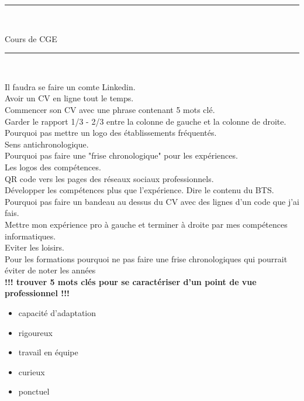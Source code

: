 \documentclass[11pt,a4paper,openany]{book}
\title{}
\author{Serrurot Gabin\\
BTS SNIR}
\date{\today}
\begin{document}
\sloppy

\begin{minipage}{0.9\linewidth}
\rule{\linewidth}{0.5mm}\\[0.2cm]
\huge\bfseries
\begin{center}
Cours de CGE
\end{center}
\rule{\linewidth}{0.5mm}\\[0.2cm]
\maketitle
\end{minipage}

\newpage

\tableofcontents

\newpage

Il faudra se faire un comte Linkedin.\\
Avoir un CV en ligne tout le temps.\\
Commencer son CV avec une phrase contenant 5 mots clé.\\
Garder le rapport 1/3 - 2/3 entre la colonne de gauche et la colonne de droite.\\
Pourquoi pas mettre un logo des établissements fréquentés.\\
Sens antichronologique.\\
Pourquoi pas faire une "frise chronologique" pour les expériences.\\
Les logos des compétences.\\
QR code vers les pages des réseaux sociaux professionnels.\\
Développer les compétences plus que l'expérience. Dire le contenu du BTS.\\
Pourquoi pas faire un bandeau au dessus du CV avec des lignes d'un code que j'ai fais.\\
Mettre mon expérience pro à gauche et terminer à droite par mes compétences informatiques.\\
Eviter les loisirs.\\
Pour les formations pourquoi ne pas faire une frise chronologiques qui pourrait éviter de noter les années\\


\textbf{!!! trouver 5 mots clés pour se caractériser d'un point de vue professionnel !!!}

\begin{itemize}
\item capacité d'adaptation
\item rigoureux
\item travail en équipe
\item curieux
\item ponctuel
\end{itemize}
\end{document}
